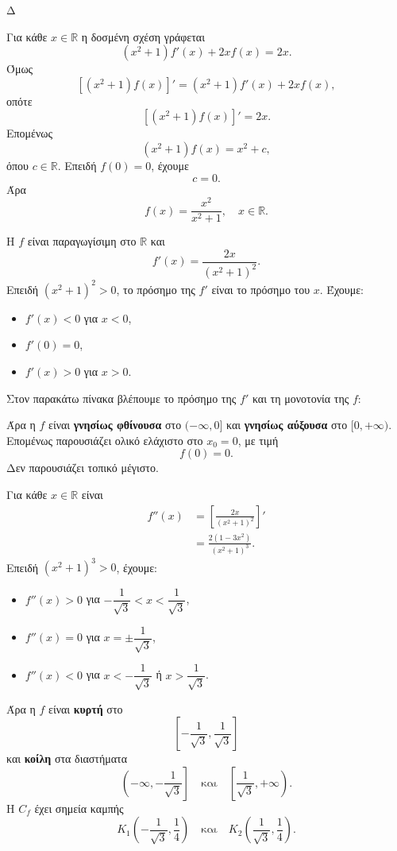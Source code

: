 \begin{thema}{Δ}
\begin{erwthma}
\item Για κάθε $x\in\mathbb{R}$ η δοσμένη σχέση γράφεται
\[
(x^2+1)f'(x)+2xf(x)=2x.
\]
Όμως
\[
\left[(x^2+1)f(x)\right]'
=(x^2+1)f'(x)+2xf(x),
\]
οπότε
\[
\left[(x^2+1)f(x)\right]'=2x.
\]
Επομένως
\[
(x^2+1)f(x)=x^2+c,
\]
όπου $c\in\mathbb{R}$. Επειδή $f(0)=0$, έχουμε
\[
c=0.
\]
Άρα
\[
{f(x)=\frac{x^2}{x^2+1}},\quad x\in\mathbb{R}.
\]

\item Η $f$ είναι παραγωγίσιμη στο $\mathbb{R}$ και
\[
f'(x)=\frac{2x}{(x^2+1)^2}.
\]
Επειδή $(x^2+1)^2>0$, το πρόσημο της $f'$ είναι το πρόσημο του $x$. Έχουμε:
\begin{itemize}
\item $f'(x)<0$ για $x<0$,
\item $f'(0)=0$,
\item $f'(x)>0$ για $x>0$.
\end{itemize}
Στον παρακάτω πίνακα βλέπουμε το πρόσημο της $f'$ και τη μονοτονία της $f$:
\begin{center}
\end{center}

Άρα η $f$ είναι \textbf{γνησίως φθίνουσα} στο $(-\infty,0]$ και \textbf{γνησίως αύξουσα} στο $[0,+\infty)$. Επομένως παρουσιάζει ολικό ελάχιστο στο $x_0=0$, με τιμή
\[
{f(0)=0}.
\]
Δεν παρουσιάζει τοπικό μέγιστο.

Για κάθε $x\in\mathbb{R}$ είναι
\begin{align*}
f''(x)
&=\left[\frac{2x}{(x^2+1)^2}\right]'\\
&=\frac{2(1-3x^2)}{(x^2+1)^3}.
\end{align*}
Επειδή $(x^2+1)^3>0$, έχουμε:
\begin{itemize}
\item $f''(x)>0$ για $-\dfrac{1}{\sqrt3}<x<\dfrac{1}{\sqrt3}$,
\item $f''(x)=0$ για $x=\pm\dfrac{1}{\sqrt3}$,
\item $f''(x)<0$ για $x<-\dfrac{1}{\sqrt3}$ ή $x>\dfrac{1}{\sqrt3}$.
\end{itemize}
Άρα η $f$ είναι \textbf{κυρτή} στο
\[
\left[-\frac{1}{\sqrt3},\frac{1}{\sqrt3}\right]
\]
και \textbf{κοίλη} στα διαστήματα
\[
\left(-\infty,-\frac{1}{\sqrt3}\right]
\quad\text{και}\quad
\left[\frac{1}{\sqrt3},+\infty\right).
\]
Η $C_f$ έχει σημεία καμπής
\[
{
K_1\left(-\frac{1}{\sqrt3},\frac14\right)}
\quad\text{και}\quad
{
K_2\left(\frac{1}{\sqrt3},\frac14\right)}.
\]


\end{erwthma}
\end{thema}
